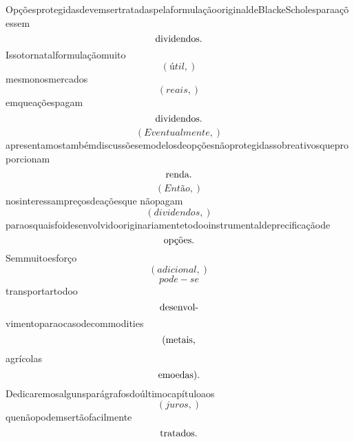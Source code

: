 \documentclass{article}
\begin{document}
\begin{equation}
\end{equation}OpçõesprotegidasdevemsertratadaspelaformulaçãooriginaldeBlackeScholesparaaçõessem\begin{equation}
$dividendos.$
\end{equation}Issotornatalformulaçãomuito\begin{equation}
\left( útil,\right)
\end{equation}mesmonosmercados\begin{equation}
\left( reais,\right)
\end{equation}emqueaçõespagam\begin{equation}
$dividendos.$
\end{equation}\begin{equation}
\left( Eventualmente,\right)
\end{equation}apresentamostambémdiscussõesemodelosdeopçõesnãoprotegidassobreativosqueproporcionam\begin{equation}
$renda.$
\end{equation}\begin{equation}
\left( Então,\right)
\end{equation}nosinteressampreçosdeaçõesque nãopagam\begin{equation}
\left( dividendos,\right)
\end{equation}paraosquaisfoidesenvolvidooriginariamentetodooinstrumentaldeprecificaçãode\begin{equation}
$opções.$
\end{equation}Semmuitoesforço\begin{equation}
\left( adicional,\right)
\end{equation}\begin{equation}
pode - se
\end{equation}transportartodoo\begin{equation}
$desenvol-$
\end{equation}vimentoparaocasodecommodities\begin{equation}
$(metais,$
\end{equation}agrícolas\begin{equation}
$emoedas).$
\end{equation}Dedicaremosalgunsparágrafosdoúltimocapítuloaos\begin{equation}
\left( juros,\right)
\end{equation}quenãopodemsertãofacilmente\begin{equation}
$tratados.$
\end{equation}\begin{equation}

\end{equation}
\end{document}
